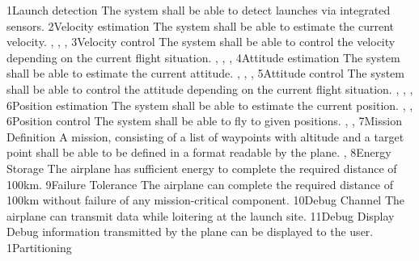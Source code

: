 \req
    {1}{Launch detection}
    {
        The system shall be able to detect launches via integrated sensors.
    }
    {
    }
    {}
\req
    {2}{Velocity estimation}
    {
        The system shall be able to estimate the current velocity.   
    }
    {
        , , , 
    }
    {}
\req
    {3}{Velocity control}
    {
        The system shall be able to control the velocity depending on
        the current flight situation.
    }
    {
        , , , 
    }
    {}
\req
    {4}{Attitude estimation}
    {
        The system shall be able to estimate the current attitude.   
    }
    {
        , , , 
    }
    {}
\req
    {5}{Attitude control}
    {
        The system shall be able to control the attitude depending on
        the current flight situation.
    }
    {
        , , , 
    }
    {}
\req
    {6}{Position estimation}
    {
        The system shall be able to estimate the current position.
    }
    {
        , , 
    }
    {}
\req
    {6}{Position control}
    {
        The system shall be able to fly to given positions.
    }
    {
        , , 
    }
    {}
\req
    {7}{Mission Definition}
    {
        A mission, consisting of a list of waypoints with altitude
        and a target point shall be able to be defined in a format
        readable by the plane.
    }
    {, }
    {}
\req
    {8}{Energy Storage}
    {
        The airplane has sufficient energy to complete the required distance
        of 100km.
    }
    {}
    {}
\req
    {9}{Failure Tolerance}
    {
        The airplane can complete the required distance of 100km without
        failure of any mission-critical component. 
    }
    {}
    {}
\req
    {10}{Debug Channel}
    {
        The airplane can transmit data while loitering
        at the launch site.
    }
    {}
    {}
\req
    {11}{Debug Display}
    {
        Debug information transmitted by the plane can be displayed
        to the user.
    }
    {}
    {}
\dd
    {1}{Partitioning}
